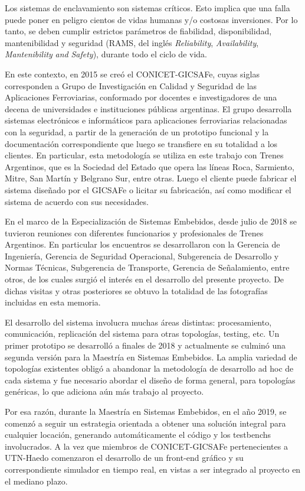 		Los sistemas de enclavamiento son sistemas críticos. Esto implica que una falla puede poner en peligro cientos de vidas humanas y/o costosas inversiones. Por lo tanto, se deben cumplir estrictos parámetros de fiabilidad, disponibilidad, mantenibilidad y seguridad (RAMS, del inglés \textit{Reliability}, \textit{Availability}, \textit{Mantenibility} \textit{and} \textit{Safety}), durante todo el ciclo de vida.
		
		En este contexto, en 2015 se creó el CONICET-GICSAFe, cuyas siglas corresponden a Grupo de Investigación en Calidad y Seguridad de las Aplicaciones Ferroviarias, conformado por docentes e investigadores de una decena de universidades e instituciones públicas argentinas\citep{GICSAFE}. El grupo desarrolla sistemas electrónicos e informáticos para aplicaciones ferroviarias relacionadas con la seguridad, a partir de la generación de un prototipo funcional y la documentación correspondiente que luego se transfiere en su totalidad a los clientes. En particular, esta metodología se utiliza en este trabajo con Trenes Argentinos, que es la Sociedad del Estado que opera las líneas Roca, Sarmiento, Mitre, San Martín y Belgrano Sur, entre otras. Luego el cliente puede fabricar el sistema diseñado por el GICSAFe o licitar su fabricación, así como modificar el sistema de acuerdo con sus necesidades.   
	
		En el marco de la Especialización de Sistemas Embebidos, desde julio de 2018 se tuvieron reuniones con diferentes funcionarios y profesionales de Trenes Argentinos. En particular los encuentros se desarrollaron con la Gerencia de Ingeniería, Gerencia de Seguridad Operacional, Subgerencia de Desarrollo y Normas Técnicas, Subgerencia de Transporte, Gerencia de Señalamiento, entre otros, de los cuales surgió el interés en el desarrollo del presente proyecto. De dichas visitas y otras posteriores se obtuvo la totalidad de las fotografías incluidas en esta memoria.
			 	
		El desarrollo del sistema involucra muchas áreas distintas: procesamiento, comunicación, replicación del sistema para otras topologías, testing, etc. Un primer prototipo se desarrolló a finales de 2018 y actualmente se culminó una segunda versión para la Maestría en Sistemas Embebidos. La amplia variedad de topologías existentes obligó a abandonar la metodología de desarrollo ad hoc de cada sistema y fue necesario abordar el diseño de forma general, para topologías genéricas, lo que adiciona aún más trabajo al proyecto.		
		
		Por esa razón, durante la Maestría en Sistemas Embebidos, en el año 2019, se comenzó a seguir un estrategia orientada a obtener una solución integral para cualquier locación, generando automáticamente el código y los testbenchs involucrados. A la vez que miembros de CONICET-GICSAFe pertenecientes a UTN-Haedo comenzaron el desarrollo de un front-end gráfico y su correspondiente simulador en tiempo real, en vistas a ser integrado al proyecto en el mediano plazo.
	
